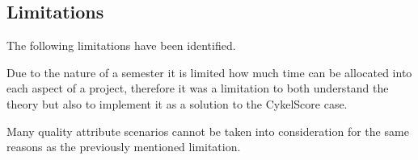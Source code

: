 
\subsection{Limitations}

The following limitations have been identified.

Due to the nature of a semester it is limited how much time can be allocated into each aspect of a project, therefore it was a limitation to both understand the theory but also to implement it as a solution to the CykelScore case.

Many quality attribute scenarios cannot be taken into consideration for the same reasons as the previously mentioned limitation. 





